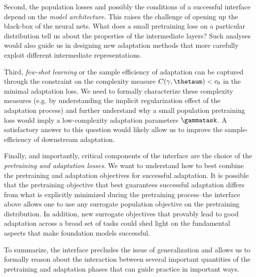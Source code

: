 Second, the population losses and possibly the conditions of a successful interface depend on the \emph{model architecture}. This raises the challenge of opening up the black-box of the neural nets. What does a small pretraining loss on a particular distribution tell us about the properties of the intermediate layers? Such analyses would also guide us in designing new adaptation methods that more carefully exploit different intermediate representations. 

Third, \emph{few-shot learning} or the sample efficiency of adaptation can be captured through the constraint on the complexity measure $C(\gamma, \thetaum) <c_0$ in the minimal adaptation loss. We need to formally characterize these complexity measures (e.g. by understanding the implicit regularization effect of the adaptation process) and further understand why a small population pretraining loss would imply a low-complexity adaptation parameters $\gammatask$. 
A satisfactory answer to this question would likely allow us to improve the sample-efficiency of downstream adaptation.

Finally, and importantly, critical components of the interface are the choice of the \emph{pretraining and adaptation losses}. We want to understand how to best combine the pretraining and adaptation objectives for successful adaptation. It is possible that the pretraining objective that best guarantees successful adaptation differs from what is explicitly minimized during the pretraining process--the interface above allows one to use any surrogate population objective on the pretraining distribution. In addition, new surrogate objectives that provably lead to good adaptation across a broad set of tasks could shed light on the fundamental aspects that make foundation models successful. 

To summarize, the interface precludes the issue of generalization and allows us to formally reason about the interaction between several important quantities of the pretraining and adaptation phases that can guide practice in important ways.

